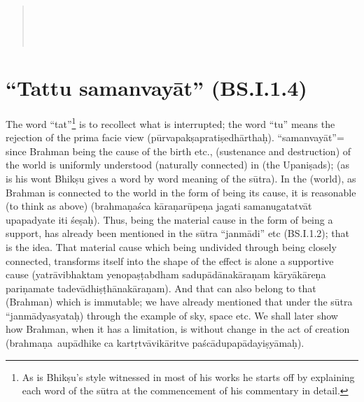 \vskip -2pt


\vskip -2pt

\begin{verse}
\\
\\
\\
\end{verse}

\section*{“Tattu samanvayāt” (BS.I.1.4)}

The word “tat”\footnote{As is Bhikṣu’s style witnessed in most of his works he starts off by explaining each word of the sūtra at the commencement of his commentary in detail.} is to recollect what is interrupted; the word “tu” means the rejection of the prima facie view (pūrvapakṣapratiṣedhā\-rthaḥ). “samanvayāt”= since Brahman being the cause of the birth etc., (sustenance and destruction) of the world is uniformly understood (naturally connected) in (the Upaniṣads); (as is his wont Bhikṣu gives a word by word meaning of the sūtra). In the (world), as Brahman is connected to the world in the form of being its cause, it is reasonable (to think as above) (brahmaṇaśca kāraṇarūpeṇa jagati samanugatatvāt upapadyate iti śeṣaḥ). Thus, being the material cause in the form of being a support, has already been mentioned in the sūtra “janmādi” etc (BS.I.1.2); that is the idea. That material cause which being undivided through being closely connected, transforms itself into the shape of the effect is alone  a supportive cause (yatrāvibhaktam yenopaṣṭabdham sadupādānakāraṇam kāryākāreṇa pariṇamate tadevādhiṣṭhānakāraṇam).  And that can also belong to that (Brahman) which is immutable; we have already mentioned that under the sūtra “janmādyasyataḥ) through the example of sky, space etc. We shall later show how Brahman, when it has a limitation, is without change in the act of creation (brahmaṇa aupādhike ca kartṛtvāvikāritve paścādupapādayiṣyāmaḥ).


